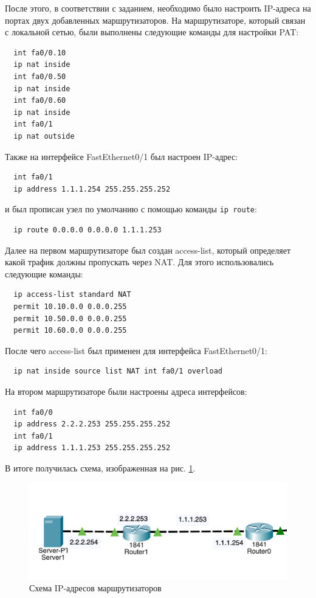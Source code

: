 \documentclass[a4paper, 14pt]{extarticle}
\begin{document}
После этого, в соответствии с заданием, необходимо было настроить IP-адреса на
портах двух добавленных маршрутизаторов. На маршрутизаторе, который связан с
локальной сетью, были выполнены следующие команды для настройки PAT:
\begin{verbatim}
  int fa0/0.10
  ip nat inside
  int fa0/0.50
  ip nat inside
  int fa0/0.60
  ip nat inside
  int fa0/1
  ip nat outside
\end{verbatim}
Также на интерфейсе FastEthernet0/1 был настроен IP-адрес:
\begin{verbatim}
  int fa0/1
  ip address 1.1.1.254 255.255.255.252
\end{verbatim}
и был прописан узел по умолчанию с помощью команды \texttt{ip route}:
\begin{verbatim}
  ip route 0.0.0.0 0.0.0.0 1.1.1.253
\end{verbatim}

Далее на первом маршрутизаторе был создан access-list, который определяет какой
трафик должны пропускать через NAT. Для этого использовались следующие команды:
\begin{verbatim}
  ip access-list standard NAT
  permit 10.10.0.0 0.0.0.255
  permit 10.50.0.0 0.0.0.255
  permit 10.60.0.0 0.0.0.255
\end{verbatim}
После чего access-list был применен для интерфейса FastEthernet0/1:
\begin{verbatim}
  ip nat inside source list NAT int fa0/1 overload
\end{verbatim}

На втором маршрутизаторе были настроены адреса интерфейсов:
\begin{verbatim}
  int fa0/0
  ip address 2.2.2.253 255.255.255.252
  int fa0/1
  ip address 1.1.1.253 255.255.255.252
\end{verbatim}

В итоге получилась схема, изображенная на рис. \ref{fig:ip}.

\begin{figure}[H]
  \centering
  \includegraphics[width=\textwidth]{images/ip.png}
  \caption{Схема IP-адресов маршрутизаторов}
  \label{fig:ip}
\end{figure}
\end{document}
